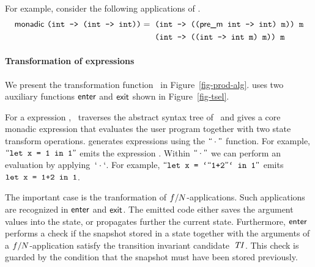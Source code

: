 For example, consider the following applications of \monadic.
%
\begin{align*}
  \monadic\ \texttt{(int -> (int -> int))} = \;
  \begin{array}[t]{@{}l@{}}
    \texttt{(int -> ((\premonadic\ int -> int) m)) m}\\[\jot]
    \texttt{(int -> ((int -> int m) m)) m}
  \end{array}
\end{align*}
%




\paragraph{\bf Transformation of expressions}


We present the transformation function \product\ in
Figure~\ref{fig-prod-alg}. 
\product uses two auxiliary functions $\textsf{enter}$ and $\textsf{exit}$
shown in Figure~\ref{fig-tsel}.

For a expression \expr, \product\ traverses the abstract syntax tree
of \expr\ and gives a core monadic expression that evaluates the user
program together with two state transform operations.
\product generates \miniocaml expressions using the $\textsf{``}\cdot\textsf{''}$
function.
For example, $\textsf{``}\texttt{let x = 1 in 1}\textsf{''}$ emits the expression
.
Within $\textsf{``}\cdot\textsf{''}$ we can perform an evaluation by
applying~$`\cdot`$.
For example, $\textsf{``}\texttt{let x = `\textsf{``}1+2\textsf{''}` in 1}\textsf{''}$ emits $\texttt{let
x = 1+2 in 1}$.

The important case is the tranformation of
$f/N$-applications.
Such applications are recognized in $\textsf{enter}$ and $\textsf{exit}$.
The emitted code either saves the argument values into the state, or
propagates further the current state.
Furthermore, $\textsf{enter}$ performs a check if the snapshot stored in a
state together with the arguments of a
$f/N$-application satisfy the transition invariant
candidate~$\mathit{TI}$.
This check is guarded by the condition that the snapshot must have
been stored previously.

